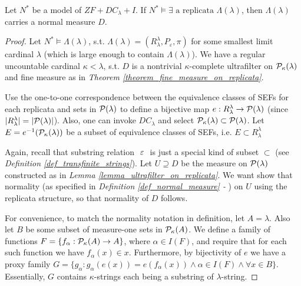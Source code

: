 \begin{theorem}\label{theorem_normal_measure_on_replicata}
    Let $N^\ast$ be a model of $ZF+DC_\lambda+I$. If $N^\ast \models \exists \text{ a replicata }\Lambda(\lambda)$, then $\Lambda(\lambda)$ carries a normal measure $D$.
\end{theorem}
\begin{proof}
    Let $N^\ast \models \Lambda(\lambda)$, s.t. $\Lambda(\lambda) = (R^{\lambda}_{\lambda}, P_\varepsilon, \pi)$ for some smallest limit cardinal $\lambda$ (which is large enough to contain $\Lambda(\lambda)$). We have a regular uncountable cardinal $\kappa < \lambda$, s.t. $D$ is a nontrivial $\kappa$-complete ultrafilter on $\mathcal{P}_{\kappa}(\lambda)$ and fine measure as in \textit{Theorem \ref{theorem_fine_measure_on_replicata}}.

    Use the one-to-one correspondence between the equivalence classes of SEFs for each replicata and sets in $\mathcal{P}(\lambda)$ to define a bijective map $e: R^{\lambda}_{\lambda} \to \mathcal{P}(\lambda)$ (since $|R^{\lambda}_{\lambda}| = |\mathcal{P}(\lambda)|$). Also, one can invoke $DC_\lambda$ and select $\mathcal{P}_{\kappa}(\lambda) \subset \mathcal{P}(\lambda)$. Let $E = e^{-1}(\mathcal{P}_{\kappa}(\lambda))$ be a subset of equivalence classes of SEFs, i.e. $E \subset R^{\lambda}_{\lambda}$

    Again, recall that substring relation $\ \varepsilon\ $ is just a special kind of subset $\subset$ (see \textit{Definition \ref{def_transfinite_strings}}). Let $U \supseteq D$ be the measure on $\mathcal{P}(\lambda)$ constructed as in \textit{Lemma \ref{lemma_ultrafilter_on_replicata}}. We want show that normality (as specified in \textit{Definition \ref{def_normal_measure} - }) on $U$ using the replicata structure, so that normality of $D$ follows. 

    For convenience, to match the normality notation in definition, let $A = \lambda$. Also let $B$ be some subset of measure-one sets in $\mathcal{P}_{\kappa}(A)$. We define a family of functions $F = \{ f_\alpha: \mathcal{P}_{\kappa}(A) \to A \}$, where $\alpha \in I(F)$, and require that for each such function we have $f_\alpha (x) \in x$. Furthermore, by bijectivity of $e$ we have a proxy family $G = \{ g_\alpha : g_\alpha(e(x)) = e(f_\alpha(x)) \land \alpha \in I(F) \land \forall x \in B \}$. Essentially, $G$ contains $\kappa$-strings each being a substring of $\lambda$-string.

\end{proof}

